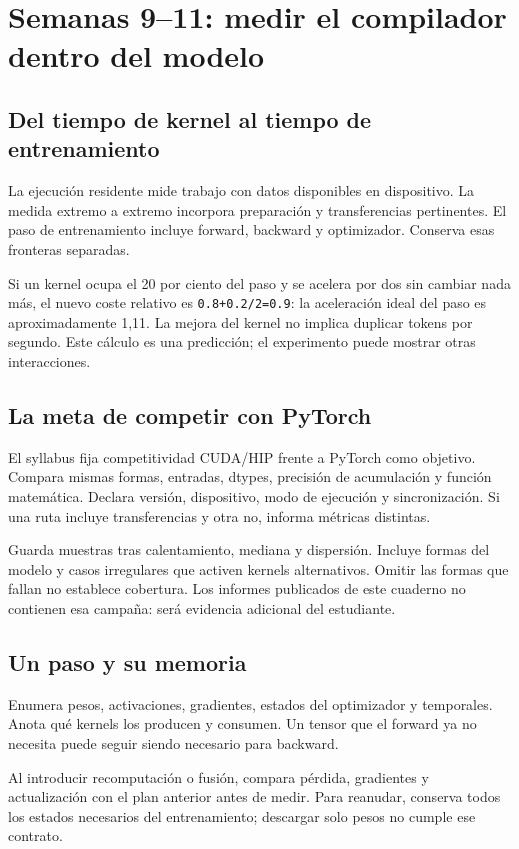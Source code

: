\documentclass[12pt,a4paper,oneside]{report}
\begin{document}
\chapter{Semanas 9--11: medir el compilador dentro del modelo}
\label{cuda:modelos-syllabus}
\section{Del tiempo de kernel al tiempo de entrenamiento}
La ejecución residente mide trabajo con datos disponibles en dispositivo. La medida extremo a extremo incorpora preparación y transferencias pertinentes. El paso de entrenamiento incluye forward, backward y optimizador. Conserva esas fronteras separadas.

Si un kernel ocupa el 20 por ciento del paso y se acelera por dos sin cambiar nada más, el nuevo coste relativo es \texttt{0.8+0.2/2=0.9}: la aceleración ideal del paso es aproximadamente 1,11. La mejora del kernel no implica duplicar tokens por segundo. Este cálculo es una predicción; el experimento puede mostrar otras interacciones.

\section{La meta de competir con PyTorch}
El syllabus fija competitividad CUDA/HIP frente a PyTorch como objetivo. Compara mismas formas, entradas, dtypes, precisión de acumulación y función matemática. Declara versión, dispositivo, modo de ejecución y sincronización. Si una ruta incluye transferencias y otra no, informa métricas distintas.

Guarda muestras tras calentamiento, mediana y dispersión. Incluye formas del modelo y casos irregulares que activen kernels alternativos. Omitir las formas que fallan no establece cobertura. Los informes publicados de este cuaderno no contienen esa campaña: será evidencia adicional del estudiante.

\section{Un paso y su memoria}
Enumera pesos, activaciones, gradientes, estados del optimizador y temporales. Anota qué kernels los producen y consumen. Un tensor que el forward ya no necesita puede seguir siendo necesario para backward.

Al introducir recomputación o fusión, compara pérdida, gradientes y actualización con el plan anterior antes de medir. Para reanudar, conserva todos los estados necesarios del entrenamiento; descargar solo pesos no cumple ese contrato.
\end{document}

